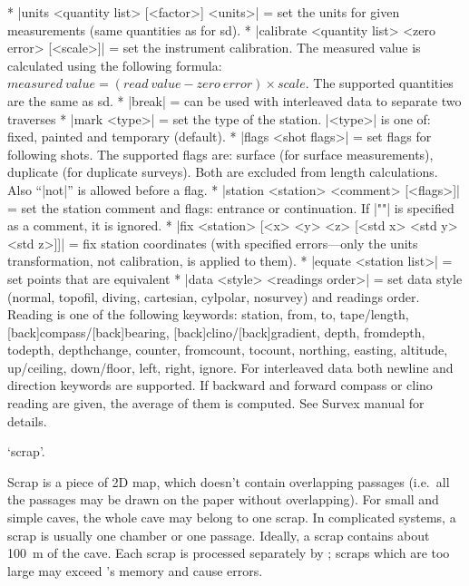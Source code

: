   * |units <quantity list> [<factor>] <units>| = set the units
    for given measurements (same quantities as for sd).
  * |calibrate <quantity list> <zero error> [<scale>]| = set the
    instrument calibration. The measured value is calculated using the
    following formula:
    $measured\ value = (read\ value - zero\ error) \times scale$.
    The supported quantities are the same as sd.
  * |break| = can be used with interleaved data to separate two traverses
  * |mark <type>| = set the type of the station. |<type>| is one of: fixed, 
    painted and temporary (default).
  * |flags <shot flags>| = set flags for following shots. The supported
    flags are: surface (for surface measurements), duplicate (for
    duplicate surveys). Both are excluded from length calculations.
    Also ``|not|'' is allowed before a flag.
  * |station <station> <comment> [<flags>]| = set the station comment
    and flags: entrance or continuation. If |""| is specified as a
    comment, it is ignored.
  * |fix <station> [<x> <y> <z> [<std x> <std y> <std z>]]| 
    = fix station coordinates (with specified errors---only 
    the units transformation, not calibration, is applied to them).
  * |equate <station list>| = set points that are equivalent
  * |data <style> <readings order>| = set data style (normal, topofil,
    diving, cartesian, cylpolar, nosurvey) and readings order. Reading
    is one of the following keywords: station, from, to, tape/length, 
    [back]compass/[back]bearing, [back]clino/[back]gradient, 
    depth, fromdepth, todepth, depthchange, counter, 
    fromcount, tocount, northing, easting, altitude,
    up/ceiling, down/floor, left, right, ignore. 
    For interleaved data both newline and direction keywords
    are supported. If backward and forward compass or clino
    reading are given, the average of them is computed.
    See Survex manual for details.
\endcomopt





\subsubchapter `scrap'.

\description
  Scrap is a piece of 2D map, which doesn't contain overlapping passages
  (i.e.~all the passages may be drawn on the paper without overlapping).
  For small and simple caves, the whole cave may belong to one scrap. 
  In complicated systems, a scrap is usually one chamber or one passage. 
  Ideally, a scrap contains about 100~m of the cave. Each scrap is processed 
  separately by \MP; scraps which are too large may exceed \MP's memory and 
  cause errors.

